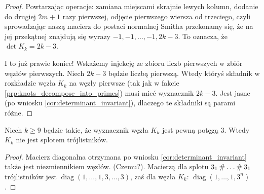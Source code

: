 \begin{proof}
    Powtarzając operacje: zamiana miejscami skrajnie lewych kolumn, dodanie do drugiej $2m+1$ razy pierwszej, odjęcie pierwszego wiersza od trzeciego, czyli sprowadzając naszą macierz do postaci normalnej Smitha przekonamy się, że na jej przekątnej znajdują się wyrazy $-1, -1, \ldots, -1, 2k-3$.
    To oznacza, że $\det K_k = 2k-3$.

    I to już prawie koniec!
    Wskażemy injekcję ze zbioru liczb pierwszych w zbiór węzłów pierwszych.
    Niech $2k-3$ będzie liczbą pierwszą.
    Wtedy któryś składnik w rozkładzie węzła $K_k$ na węzły pierwsze (tak jak w fakcie \ref{prp:knots_decompose_into_primes}) musi mieć wyznacznik $2k-3$.
    Jest jasne (po wniosku \ref{cor:determinant_invariant}), dlaczego te składniki są parami różne.
\end{proof}

\begin{proposition}
    Niech $k \ge 9$ będzie takie, że wyznacznik węzła $K_k$ jest pewną potęgą $3$.
    Wtedy $K_k$ nie jest splotem trójlistników.
\end{proposition}

\begin{proof}
    Macierz diagonalna otrzymana po wniosku \ref{cor:determinant_invariant} także jest niezmiennikiem węzłów.
    (Czemu?).
    Macierzą dla splotu $3_1 \mathbin{\#} \ldots \mathbin{\#} 3_1$ trójlistników jest $\operatorname{diag}(1, \ldots, 1, 3, \ldots, 3)$, zaś dla węzła $K_k$: $\operatorname{diag} (1, \ldots, 1, 3^n)$.
\end{proof}

%


